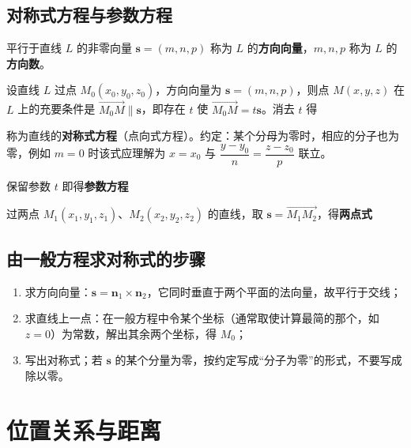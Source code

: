 \subsection{对称式方程与参数方程}

\begin{definition}
平行于直线 $L$ 的非零向量 $\boldsymbol{s}=(m,n,p)$ 称为 $L$ 的\textbf{方向向量}，$m,n,p$ 称为 $L$ 的\textbf{方向数}。
\end{definition}

设直线 $L$ 过点 $M_0(x_0,y_0,z_0)$，方向向量为 $\boldsymbol{s}=(m,n,p)$，则点 $M(x,y,z)$ 在 $L$ 上的充要条件是 $\overrightarrow{M_0M}\parallel\boldsymbol{s}$，即存在 $t$ 使 $\overrightarrow{M_0M}=t\boldsymbol{s}$。消去 $t$ 得


称为直线的\textbf{对称式方程}（点向式方程）。约定：某个分母为零时，相应的分子也为零，例如 $m=0$ 时该式应理解为 $x=x_0$ 与 $\dfrac{y-y_0}{n}=\dfrac{z-z_0}{p}$ 联立。

保留参数 $t$ 即得\textbf{参数方程}


过两点 $M_1(x_1,y_1,z_1)$、$M_2(x_2,y_2,z_2)$ 的直线，取 $\boldsymbol{s}=\overrightarrow{M_1M_2}$，得\textbf{两点式}


\subsection{由一般方程求对称式的步骤}

\begin{enumerate}
\item 求方向向量：$\boldsymbol{s}=\boldsymbol{n}_1\times\boldsymbol{n}_2$，它同时垂直于两个平面的法向量，故平行于交线；
\item 求直线上一点：在一般方程中令某个坐标（通常取使计算最简的那个，如 $z=0$）为常数，解出其余两个坐标，得 $M_0$；
\item 写出对称式；若 $\boldsymbol{s}$ 的某个分量为零，按约定写成“分子为零”的形式，不要写成除以零。
\end{enumerate}

\section{位置关系与距离}

